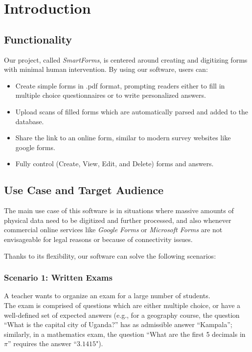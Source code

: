 \documentclass[12pt, a4paper]{report}
\begin{document}
\tableofcontents

\cleardoublepage
\pagestyle{main}
\let\ps@plain\ps@main


\chapter{Introduction}

\section{Functionality}

Our project, called \textit{SmartForms}, is centered around creating and digitizing forms with minimal human intervention. By using our software, users can:
\begin{itemize}
    \item Create simple forms in .pdf format, prompting readers either to fill in multiple choice questionnaires or to write personalized answers.
    \item Upload scans of filled forms which are automatically parsed and added to the database.
    \item Share the link to an online form, similar to modern survey websites like google forms.
    \item Fully control (Create, View, Edit, and Delete) forms and answers.
\end{itemize}

\section{Use Case and Target Audience}

The main use case of this software is in situations where massive amounts of physical data need to be digitized and further processed, and also whenever commercial online services like \textit{Google Forms} or \textit{Microsoft Forms} are not envisageable for legal reasons or because of connectivity issues.

Thanks to its flexibility, our software can solve the following scenarios:

\subsection*{Scenario 1: Written Exams}

A teacher wants to organize an exam for a large number of students.\\
The exam is comprised of questions which are either multiple choice, or have a well-defined set of expected answers (e.g., for a geography course, the question ``What is the capital city of Uganda?'' has as admissible answer ``Kampala''; similarly, in a mathematics exam, the question ``What are the first 5 decimals in $\pi$'' requires the answer ``$3.1415$").
\end{document}
